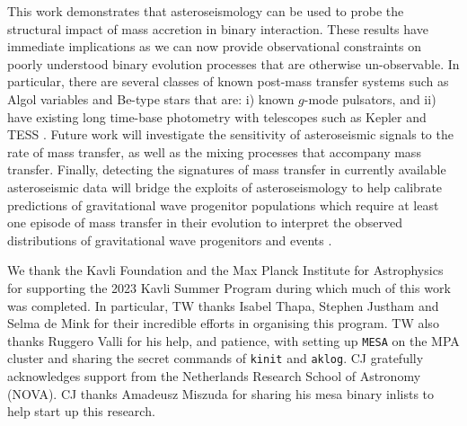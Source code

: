 \documentclass[twocolumn, twocolappendix, oneside]{aastex631}
\newcommand{\gmode}{$g$-mode\xspace}
\newcommand{\mesa}{\texttt{MESA}\xspace}
\begin{document}
This work demonstrates that asteroseismology can be used to probe the structural impact of mass accretion in binary interaction. These results have immediate implications as we can now provide observational constraints on poorly understood binary evolution processes that are otherwise un-observable. In particular, there are several classes of known post-mass transfer systems such as Algol variables and Be-type stars that are: i) known \gmode pulsators, and ii) have existing long time-base photometry with telescopes such as Kepler \citep{Borucki+2010} and TESS \citep{Ricker+2015}. Future work will investigate the sensitivity of asteroseismic signals to the rate of mass transfer, as well as the mixing processes that accompany mass transfer. Finally, detecting the signatures of mass transfer in currently available asteroseismic data will bridge the exploits of asteroseismology to help calibrate predictions of gravitational wave progenitor populations which require at least one episode of mass transfer in their evolution to interpret the observed distributions of gravitational wave progenitors and events \citep{Abbott+2023}.  


\begin{acknowledgements}
    We thank the Kavli Foundation and the Max Planck Institute for Astrophysics for supporting the 2023 Kavli Summer Program during which much of this work was completed. In particular, TW thanks Isabel Thapa, Stephen Justham and Selma de Mink for their incredible efforts in organising this program. TW also thanks Ruggero Valli for his help, and patience, with setting up \mesa on the MPA cluster and sharing the secret commands of \texttt{kinit} and \texttt{aklog}. CJ gratefully acknowledges support from the Netherlands Research School of Astronomy (NOVA). CJ thanks Amadeusz Miszuda for sharing his {\sc mesa} {\sc binary} inlists to help start up this research.
\end{acknowledgements}
\end{document}
